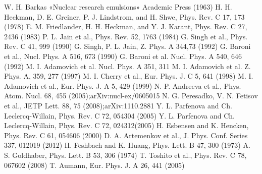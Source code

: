 \documentclass[fontsize=14pt]{scrarticle}
\begin{document}
\begin{thebibliography}{57}
 {W. H. Barkas «Nuclear research emulsions» Academic Press (1963)}
 {H. H. Heckman, D. E. Greiner, P. J. Lindstrom, and H. Shwe, Phys. Rev. C 17, 173 (1978)}
 {E. M. Friedlander, H. H. Heckman, and Y. J. Karant, Phys. Rev. C 27, 2436 (1983)}
 {P. L. Jain et al., Phys. Rev. 52, 1763 (1984)}
 {G. Singh et al., Phys. Rev. C 41, 999 (1990)}
 {G. Singh, P. L. Jain, Z. Phys. A 344,73 (1992)}
 {G. Baroni et al., Nucl. Phys. A 516, 673 (1990)}
 {G. Baroni et al. Nucl. Phys. A 540, 646 (1992)}
 {M. I. Adamovich et al. Nucl. Phys. A 351, 311}
 {M. I. Adamovich et al. Z. Phys. A, 359, 277 (1997)}
 {M. I. Cherry et al., Eur. Phys. J. C 5, 641 (1998)}
 {M. I. Adamovich et al., Eur. Phys. J. A 5, 429 (1999)}
 {N. P. Andreeva et al., Phys. Atom. Nucl. 68, 455 (2005);arXiv:nucl-ex/0605015}
 {N. G. Peresadko, V. N. Fetisov et al., JETP Lett. 88, 75 (2008);arXiv:1110.2881}
 {Y. L. Parfenova and Ch. Leclercq-Willain, Phys. Rev. C 72, 054304 (2005)}
 {Y. L. Parfenova and Ch. Leclercq-Willain, Phys. Rev. C 72, 024312(2005)}
 {H. Esbensen and K. Hencken, Phys. Rev. C 61, 054606 (2000)}
 {D. A. Artemenkov et al., J. Phys. Conf. Series 337, 012019 (2012)}
 {H. Feshbach and K. Huang, Phys. Lett. B 47, 300 (1973)}
 {A. S. Goldhaber, Phys. Lett. B 53, 306 (1974)}
 {T. Toshito et al., Phys. Rev. C 78, 067602 (2008)}
 {T. Aumann, Eur. Phys. J. A 26, 441 (2005)}
\end{thebibliography}
	
\end{document}
